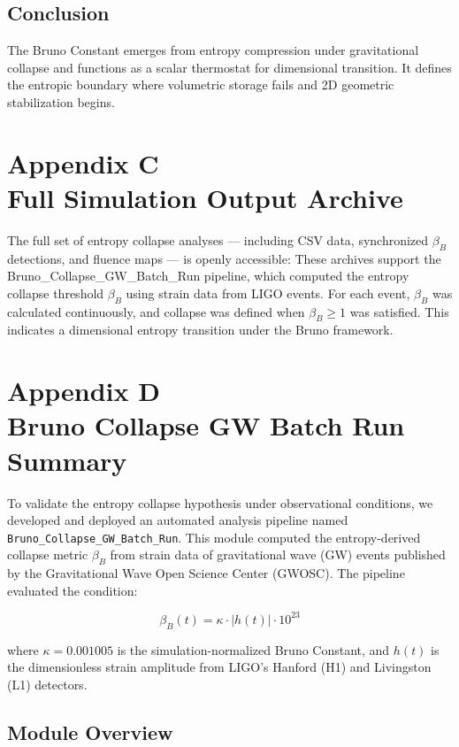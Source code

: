 \documentclass[12pt]{article}
\begin{document}
\clearpage
\subsection*{Conclusion}

The Bruno Constant emerges from entropy compression under gravitational collapse and functions as a scalar thermostat for dimensional transition. It defines the entropic boundary where volumetric storage fails and 2D geometric stabilization begins.

\clearpage
\section*{Appendix C \\ Full Simulation Output Archive}

The full set of entropy collapse analyses — including CSV data, synchronized $\beta_B$ detections, and fluence maps — is openly accessible:
These archives support the Bruno\_Collapse\_GW\_Batch\_Run pipeline, which computed the entropy collapse threshold $\beta_B$ using strain data from LIGO events. For each event, $\beta_B$ was calculated continuously, and collapse was defined when $\beta_B \geq 1$ was satisfied. This indicates a dimensional entropy transition under the Bruno framework.

\clearpage
\section*{Appendix D \\ Bruno Collapse GW Batch Run Summary}

To validate the entropy collapse hypothesis under observational conditions, we developed and deployed an automated analysis pipeline named \texttt{Bruno\_Collapse\_GW\_Batch\_Run}. This module computed the entropy-derived collapse metric $\beta_B$ from strain data of gravitational wave (GW) events published by the Gravitational Wave Open Science Center (GWOSC). The pipeline evaluated the condition:

\[
  \beta_B(t) = \kappa \cdot |h(t)| \cdot 10^{23}
\]

where $\kappa = 0.001005$ is the simulation-normalized Bruno Constant, and $h(t)$ is the dimensionless strain amplitude from LIGO's Hanford (H1) and Livingston (L1) detectors.

\vspace{1em}
\clearpage
\subsection*{Module Overview}
\end{document}
